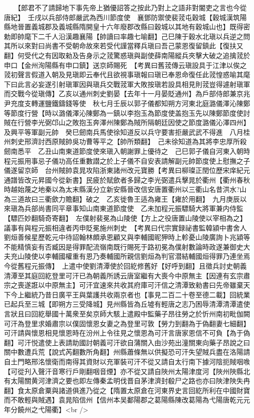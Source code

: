 　　【郎君不了請歸地下事先帝上猶優詔答之按此乃對上之語非對閽吏之言也今從唐紀】　壬戌以兵部侍郎嚴武為西川節度使　襄鄧防禦使裴茙屯穀城【穀城漢筑陽縣地晉置義城郡及義城縣隋開皇十六年廢郡改縣曰穀城以其地有穀城山也】既得密勅即帥麾下二千人沿漢趣襄陽【帥讀曰率趣七喻翻】己巳陳于穀水北瑱以兵逆之問其所以來對曰尚書不受朝命故來若受代謹當釋兵瑱曰吾己蒙恩復留鎮此【復扶又翻】何受代之有因取勑及告身示之茙驚惑瑱與副使薛南陽縱兵夾擊大破之追擒茙於申口【金州洵陽縣有申口鎮】送京師賜死　【考異曰舊茙傳云瑱設具于江津以俟之茙初聲言假道入朝及見瑱即云奉代且欲視事瑱報曰瑱已奉恩命復任此茙惶惑喻其麾下曰此言必妄遂引射瑱軍因與瑱兵交戰茙軍大敗按瑱若設具相見則茙豈得遽射瑱軍而交戰今從瑱傳】乙亥以通州刺史劉晏【去年十一月晏貶通州】為戶部侍郎兼京兆尹充度支轉運鹽鐵鑄錢等使　秋七月壬辰以郭子儀都知朔方河東北庭潞儀澤沁陳鄭等節度行營【時以潞儀澤沁陳鄭為一鎮以李抱玉為節度使盖抱玉先以陳鄭節度使討賊在行營李光弼邙山之敗抱玉奔澤州陳鄭為賊所隔朝廷因使之節度潞儀沁澤四州】及興平等軍副元帥　癸巳劒南兵馬使徐知道反以兵守要害拒嚴武武不得進　八月桂州刺史邢濟討西原賊帥吳功曹等平之【帥所類翻】　己未徐知道為其將李忠厚所殺劒南悉平　乙丑山南東道節度使來瑱入朝謝罪上優待之　己巳郭子儀自河東入朝時程元振用事忌子儀功高任重數譛之於上子儀不自安表請解副元帥節度使上慰撫之子儀遂留京師　台州賊帥袁晁攻陷浙東諸州改元寶勝【考異曰柳璨正閏位歷宋庠紀元通譜皆改元昇國今從新書】民疲於賦歛者多歸之李光弼遣兵擊晁於衢州【衢州春秋時越始蔑之地秦以為太末縣漢分立新安縣晉改信安唐置衢州以三衢山名昔洪水?山為三道故曰三衢歛力贍翻】破之　乙亥徙魯王适為雍王【雍於用翻】　九月庚辰以來瑱為兵部尚書同平章事知山南東道節度使　乙未加程元振驃騎大將軍兼内侍監【驃匹妙翻騎奇寄翻】　左僕射裴冕為山陵使【方上之役唐置山陵使以宰相為之】議事有與程元振相違者丙申貶冕施州刺史　【考異曰代宗實録祕書監韓潁中書舍人劉烜善候星歷乾元中待詔翰林頗承恩顧又與李輔國昵狎時上軫憂山陵廣詢卜兆潁等不能精慎妄有否臧因是得罪配流嶺南既行賜死于路初冕為僕射數論時政遂兼御史大夫充山陵使以李輔國權重有恩乃奏輔國所親信劉烜為判官潜結輔國烜得罪乃連坐焉今從舊程元振傳】　上遣中使劉清潭使於回紇修舊好【好呼到翻】且徵兵討史朝義清潭至其庭回紇登里可汗已為朝義所誘云唐室繼有大喪今中原無主【因連有玄宗肅宗之喪遂誑以中原無主】可汗宜速來共收其府庫可汗信之清潭致勑書曰先帝雖棄天下今上繼統乃昔日廣平王與葉護共收兩京者也【事見二百二十卷至德二載】回統業已起兵至三城【即朔方三受降城】見州縣皆為丘墟有輕唐之志乃困辱清潭清潭遣使言狀且曰回紇舉國十萬衆至矣京師大駭上遣殿中監藥子昂往勞之於忻州南初毗伽闕可汗為登里求婚肅宗以僕固懷恩女妻之為登里可敦【勞力到翻為于偽翻妻七細翻】可汗請與懷恩相見懷恩時在汾州上令往見之懷恩為可汗言唐家恩信不可負【為于偽翻】可汗悦遣使上表請助國討朝義可汗欲自蒲關入由沙苑出潼關東向藥子昂說之曰關中數遭兵荒【說式芮翻數所角翻】州縣蕭條無以供擬恐可汗失望賊兵盡在洛陽請自土門略邢洺懷衛而南得其資財以充軍裝可汗不從又請自太行南下據河陰扼賊咽㗋【可從刋入聲汗音寒行戶剛翻咽音煙】亦不從又請自陜州太陽津度河【陜州陜縣北有太陽關黄河津濟之要也即左傳秦孟明伐晋自茅津濟封殽尸之路也亦曰陜津陜失冉翻】食太原倉粟與諸道俱進乃從之【隋置太原倉在河東界史言回紇所利在中國財寶而不敢輕與賊遇】袁晁陷信州【信州本吴鄱陽郡之葛陽縣陳改葛陽為弋陽唐乾元元年分饒州之弋陽衢】<br />
